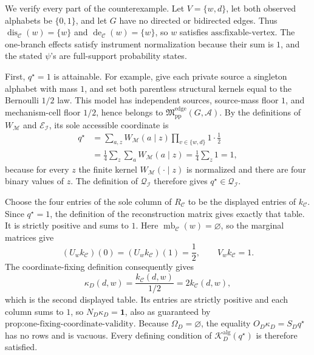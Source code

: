 We verify every part of the counterexample.  Let \(V=\{w,d\}\), let both observed alphabets be \(\{0,1\}\), and let \(G\) have no directed or bidirected edges.  Thus \(\operatorname{dis}_{\mathcal C}(w)=\{w\}\) and \(\operatorname{de}_{\mathcal C}(w)=\{w\}\), so \(w\) satisfies \(\text{ass:fixable-vertex}\).  The one-branch effects satisfy instrument normalization because their sum is \(1\), and the stated \(\psi\)'s are full-support probability states.

First, \(q^{\star}=1\) is attainable.  For example, give each private source a singleton alphabet with mass \(1\), and set both parentless structural kernels equal to the Bernoulli \(1/2\) law.  This model has independent sources, source-mass floor \(1\), and mechanism-cell floor \(1/2\), hence belongs to \(\mathfrak M_{\mathrm{pp}}^{\mathrm{edge}}(G,\mathcal A)\).  By the definitions of \(W_{\mathcal M}\) and \(\mathcal E_{\mathcal I}\), its sole accessible coordinate is
\[
\begin{aligned}
q^{\star}
&=\sum_{a,z}W_{\mathcal M}(a\mid z)
  \prod_{v\in\{w,d\}}1\cdot\frac12\\
&=\frac14\sum_z\sum_a W_{\mathcal M}(a\mid z)
=\frac14\sum_z1=1,
\end{aligned}
\]
because for every \(z\) the finite kernel \(W_{\mathcal M}(\cdot\mid z)\) is normalized and there are four binary values of \(z\).  The definition of \(\mathcal Q_{\mathcal I}\) therefore gives \(q^{\star}\in\mathcal Q_{\mathcal I}\).

Choose the four entries of the sole column of \(R_{\mathcal C}\) to be the displayed entries of \(k_{\mathcal C}\).  Since \(q^{\star}=1\), the definition of the reconstruction matrix gives exactly that table.  It is strictly positive and sums to \(1\).  Here \(\operatorname{mb}_{\mathcal C}(w)=\varnothing\), so the marginal matrices give
\[
(U_wk_{\mathcal C})(0)=(U_wk_{\mathcal C})(1)=\frac12,
\qquad V_wk_{\mathcal C}=1.
\]
The coordinate-fixing definition consequently gives
\[
\kappa_D(d,w)=\frac{k_{\mathcal C}(d,w)}{1/2}=2k_{\mathcal C}(d,w),
\]
which is the second displayed table.  Its entries are strictly positive and each column sums to \(1\), so \(N_D\kappa_D=\mathbf1\), also as guaranteed by \(\text{prop:one-fixing-coordinate-validity}\).  Because \(\Omega_D=\varnothing\), the equality \(O_D\kappa_D=S_Dq^{\star}\) has no rows and is vacuous.  Every defining condition of \(\mathcal K_D^{\mathrm{alg}}(q^{\star})\) is therefore satisfied.

